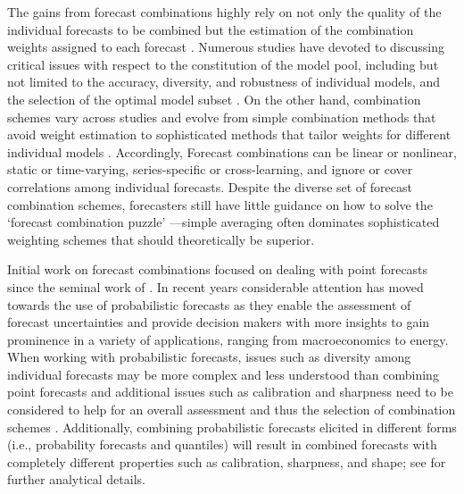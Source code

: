 \documentclass[11pt]{article}
\begin{document}
The gains from forecast combinations highly rely on not only the quality of the individual forecasts to be combined but the estimation of the combination weights assigned to each forecast \citep{Timmermann2006-en,Cang2014-tp}. Numerous studies have devoted to discussing critical issues with respect to the constitution of the model pool, including but not limited to the accuracy, diversity, and robustness of individual models, and the selection of the optimal model subset \citep{Batchelor1995-ps,Mannes2014-dl,Thomson2019-al,Lichtendahl2020-ut,Kang2021-ol}. On the other hand, combination schemes vary across studies and evolve from simple combination methods that avoid weight estimation \citep[e.g.,][]{Clemen1986-pd,Palm1992-im,Genre2013-ut,Grushka-Cockayne2017-dj,Petropoulos2020-fp} to sophisticated methods that tailor weights for different individual models \citep[e.g.,][]{Bates1969-yj,Newbold1974-lp,Kolassa2011-ai,Li2020-od,Montero-Manso2020-tq,Kang2021-ol,Wang2021-un}. Accordingly, Forecast combinations can be linear or nonlinear, static or time-varying, series-specific or cross-learning, and ignore or cover correlations among individual forecasts. Despite the diverse set of forecast combination schemes, forecasters still have little guidance on how to solve the `forecast combination puzzle' \citep{Stock2004-rq,Smith2009-wd,Claeskens2016-pv,Chan2018-jl}---simple averaging often dominates sophisticated weighting schemes that should theoretically be superior.

Initial work on forecast combinations focused on dealing with point forecasts since the seminal work of \cite{Bates1969-yj} \citep[see, for example,][]{Clemen1989-fb,Timmermann2006-en}. In recent years considerable attention has moved towards the use of probabilistic forecasts \citep[e.g.,][]{Hall2007-lh,Gneiting2013-hl,Kapetanios2015-bb,Martin2021-yi} as they enable the assessment of forecast uncertainties and provide decision makers with more insights to gain prominence in a variety of applications, ranging from macroeconomics to energy. When working with probabilistic forecasts, issues such as diversity among individual forecasts may be more complex and less understood than combining point forecasts \citep{Ranjan2010-jl} and additional issues such as calibration and sharpness need to be considered to help for an overall assessment and thus the selection of combination schemes \citep{Gneiting2007-fr}. Additionally, combining probabilistic forecasts elicited in different forms (i.e., probability forecasts and quantiles) will result in combined forecasts with completely different properties such as calibration, sharpness, and shape; see \cite{Lichtendahl2013-rt} for further analytical details.
\end{document}
